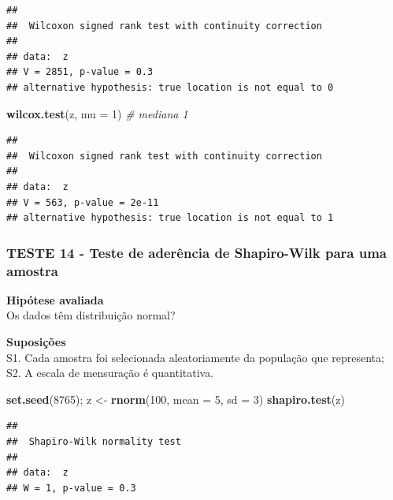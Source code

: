 \documentclass[
]{book}
\newenvironment{Shaded}{\begin{snugshade}}{\end{snugshade}}
\newcommand{\CommentTok}[1]{\textcolor[rgb]{0.56,0.35,0.01}{\textit{#1}}}
\newcommand{\DataTypeTok}[1]{\textcolor[rgb]{0.13,0.29,0.53}{#1}}
\newcommand{\DecValTok}[1]{\textcolor[rgb]{0.00,0.00,0.81}{#1}}
\newcommand{\KeywordTok}[1]{\textcolor[rgb]{0.13,0.29,0.53}{\textbf{#1}}}
\newcommand{\NormalTok}[1]{#1}
\newcommand{\StringTok}[1]{\textcolor[rgb]{0.31,0.60,0.02}{#1}}
\theoremstyle{definition}
\theoremstyle{definition}
\theoremstyle{definition}
\theoremstyle{remark}
\begin{document}
\begin{verbatim}
## 
##  Wilcoxon signed rank test with continuity correction
## 
## data:  z
## V = 2851, p-value = 0.3
## alternative hypothesis: true location is not equal to 0
\end{verbatim}

\begin{Shaded}
\begin{Highlighting}[]
\KeywordTok{wilcox.test}\NormalTok{(z, }\DataTypeTok{mu =} \DecValTok{1}\NormalTok{) }\CommentTok{\# mediana 1}
\end{Highlighting}
\end{Shaded}

\begin{verbatim}
## 
##  Wilcoxon signed rank test with continuity correction
## 
## data:  z
## V = 563, p-value = 2e-11
## alternative hypothesis: true location is not equal to 1
\end{verbatim}

\hypertarget{teste-14---teste-de-aderuxeancia-de-shapiro-wilk-para-uma-amostra}{%
\subsubsection*{TESTE 14 - Teste de aderência de Shapiro-Wilk para uma amostra}\label{teste-14---teste-de-aderuxeancia-de-shapiro-wilk-para-uma-amostra}}

\textbf{Hipótese avaliada}\\
Os dados têm distribuição normal?

\textbf{Suposições}\\
S1. Cada amostra foi selecionada aleatoriamente da população que representa;\\
S2. A escala de mensuração é quantitativa.

\begin{Shaded}
\begin{Highlighting}[]
\KeywordTok{set.seed}\NormalTok{(}\DecValTok{8765}\NormalTok{); z \textless{}{-}}\StringTok{ }\KeywordTok{rnorm}\NormalTok{(}\DecValTok{100}\NormalTok{, }\DataTypeTok{mean =} \DecValTok{5}\NormalTok{, }\DataTypeTok{sd =} \DecValTok{3}\NormalTok{)}
\KeywordTok{shapiro.test}\NormalTok{(z)}
\end{Highlighting}
\end{Shaded}

\begin{verbatim}
## 
##  Shapiro-Wilk normality test
## 
## data:  z
## W = 1, p-value = 0.3
\end{verbatim}
\end{document}
